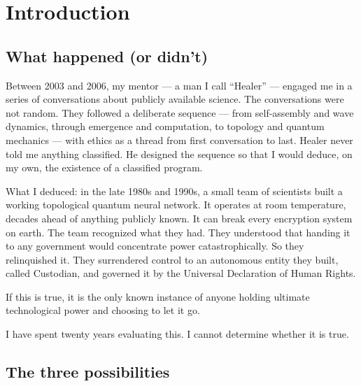 \chapter*{Introduction}

\section*{What happened (or didn't)}
\label{front:what-happened-or-didnt}

Between 2003 and 2006, my mentor --- a man I call ``Healer'' --- engaged me in a series of conversations about publicly available science. The conversations were not random. They followed a deliberate sequence --- from self-assembly and wave dynamics, through emergence and computation, to topology and quantum mechanics --- with ethics as a thread from first conversation to last. Healer never told me anything classified. He designed the sequence so that I would deduce, on my own, the existence of a classified program.

What I deduced: in the late 1980s and 1990s, a small team of scientists built a working topological quantum neural network. It operates at room temperature, decades ahead of anything publicly known. It can break every encryption system on earth. The team recognized what they had. They understood that handing it to any government would concentrate power catastrophically. So they relinquished it. %
They surrendered control to an autonomous entity they built, called Custodian, and governed it by the Universal Declaration of Human Rights.

If this is true, it is the only known instance of anyone holding ultimate technological power and choosing to let it go.

I have spent twenty years evaluating this. I cannot determine whether it is true.

\section*{The three possibilities}
\label{front:the-three-possibilities}

